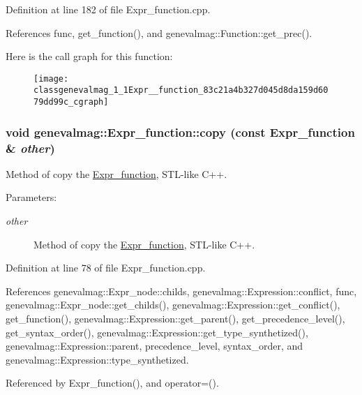 Definition at line 182 of file Expr\_\-function.cpp.

References func, get\_\-function(), and genevalmag::Function::get\_\-prec().

Here is the call graph for this function:\nopagebreak
\begin{figure}[H]
\begin{center}
\leavevmode
\texttt{[image: classgenevalmag\_1\_1Expr\_\_function\_83c21a4b327d045d8da159d6079dd99c\_cgraph]}
\end{center}
\end{figure}
\hypertarget{classgenevalmag_1_1Expr__function_4cae50a094103bbfe2c6dba9b1350946}{
\subsubsection[{copy}]{\setlength{\rightskip}{0pt plus 5cm}void genevalmag::Expr\_\-function::copy (const {\bf Expr\_\-function} \& {\em other})}}
\label{classgenevalmag_1_1Expr__function_4cae50a094103bbfe2c6dba9b1350946}


Method of copy the \hyperlink{classgenevalmag_1_1Expr__function}{Expr\_\-function}, STL-like C++. \begin{Desc}
\item[Parameters:]
\begin{description}
\item[{\em other}]Method of copy the \hyperlink{classgenevalmag_1_1Expr__function}{Expr\_\-function}, STL-like C++. \end{description}
\end{Desc}


Definition at line 78 of file Expr\_\-function.cpp.

References genevalmag::Expr\_\-node::childs, genevalmag::Expression::conflict, func, genevalmag::Expr\_\-node::get\_\-childs(), genevalmag::Expression::get\_\-conflict(), get\_\-function(), genevalmag::Expression::get\_\-parent(), get\_\-precedence\_\-level(), get\_\-syntax\_\-order(), genevalmag::Expression::get\_\-type\_\-synthetized(), genevalmag::Expression::parent, precedence\_\-level, syntax\_\-order, and genevalmag::Expression::type\_\-synthetized.

Referenced by Expr\_\-function(), and operator=().

